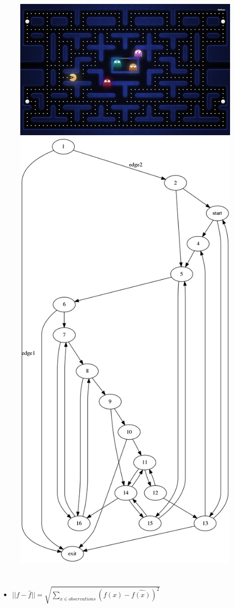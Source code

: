 \documentclass{beamer}
\begin{document}
\begin{frame}
\begin{columns}[c]
\begin{figure}
\includegraphics[width=0.5\linewidth]{lucasplots/pac-man.jpg}
\includegraphics[width=0.5\linewidth]{uCOREPICS/graphPacMan.png}
\end{figure}

\end{columns}

\begin{itemize}

\item[] $||f - \hat{f}|| = \sqrt{\sum\nolimits_{x \in observations}(f(x) - \hat{f(x)})^2}$ 
\end{itemize}


\end{frame}

\end{document}
